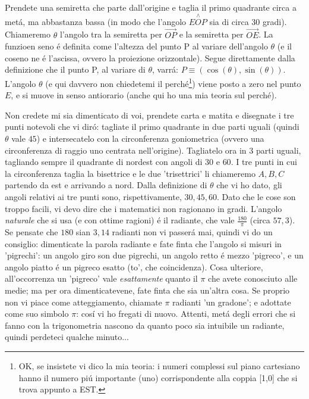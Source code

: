 Prendete una semiretta che parte dall'origine e taglia il primo quadrante circa a met\'a, ma abbastanza bassa (in modo che l'angolo $E\stackrel{\wedge}{O}P$ sia di circa 30 gradi). 
Chiameremo $\theta$ l'angolo tra la semiretta per $\overrightarrow{OP}$ e la semiretta per $\overrightarrow{OE}$. La funzioen seno \'e definita
come l'altezza del punto P al variare dell'angolo $\theta$ (e il coseno ne \'e l'ascissa, ovvero la proiezione orizzontale).
Segue direttamente dalla definizione che il punto P, al variare di $\theta$, varr\'a: $P \equiv (\cos(\theta),\sin(\theta))$.
L'angolo $\theta$ (e qui davvero non chiedetemi il perch\'e\footnote{OK, se insistete vi dico la mia teoria: i numeri complessi
sul piano cartesiano hanno il numero pi\'u importante (uno) corrispondente alla coppia [1,0] che si trova appunto a EST.})
viene posto a zero nel punto $E$, e si muove in senso antiorario (anche qui ho una mia teoria sul perch\'e).

Non credete mi sia dimenticato di voi, prendete carta e matita e disegnate i tre punti notevoli che vi dir\'o: tagliate il primo quadrante
in due parti uguali (quindi $\theta$ vale $45$) e intersecatelo con la circonferenza goniometrica (ovvero una circonferenza di raggio uno centrata nell'origine).
Tagliatelo ora in 3 parti uguali, tagliando sempre il quadrante di nordest con angoli di $30$ e $60$. I tre punti in cui la circonferenza taglia la bisettrice
e le due 'trisettrici' li chiameremo $A,B,C$ partendo da est e arrivando a nord. Dalla definizione di $\theta$ che vi ho dato, gli angoli relativi ai tre punti
sono, rispettivamente, $30,45,60$. Dato che le cose son troppo facili, vi devo dire che i matematici non ragionano in gradi. L'angolo {\em naturale} che
si usa (e con ottime ragioni) \'e il radiante, che vale $\frac{180}{\pi}$ (circa $57,3$). Se pensate che $180$ sian $3,14$ radianti non vi passer\'a mai,
quindi vi do un consiglio: dimenticate la parola radiante e fate finta che l'angolo si misuri in 'pigrechi': un angolo giro son due pigrechi, un angolo retto
\'e mezzo 'pigreco', e un angolo piatto \'e un pigreco esatto (to', che coincidenza). Cosa ulteriore, all'occorrenza un 'pigreco' vale {\em esattamente}
quanto il $\pi$ che avete conosciuto alle medie; ma per ora dimenticatevene, fate finta che sia un'altra cosa. Se proprio non vi piace come atteggiamento,
chiamate $\pi$ radianti 'un gradone'; e adottate come suo simbolo $\pi$: cos\'i vi ho fregati di nuovo. Attenti, met\'a degli errori che si fanno con
la trigonometria nascono da quanto poco sia intuibile un radiante, quindi perdeteci qualche minuto...

